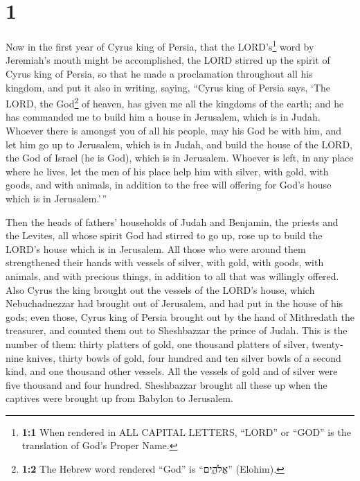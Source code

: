 \hypertarget{section}{%
\section{1}\label{section}}

 Now in the first year of Cyrus king of Persia, that the
LORD's\footnote{\textbf{1:1} When rendered in ALL CAPITAL LETTERS,
  ``LORD'' or ``GOD'' is the translation of God's Proper Name.} word by
Jeremiah's mouth might be accomplished, the LORD stirred up the spirit
of Cyrus king of Persia, so that he made a proclamation throughout all
his kingdom, and put it also in writing, saying,  ``Cyrus
king of Persia says, `The LORD, the God\footnote{\textbf{1:2} The Hebrew
  word rendered ``God'' is ``אֱלֹהִ֑ים'' (Elohim).} of heaven, has given
me all the kingdoms of the earth; and he has commanded me to build him a
house in Jerusalem, which is in Judah.  Whoever there is
amongst you of all his people, may his God be with him, and let him go
up to Jerusalem, which is in Judah, and build the house of the LORD, the
God of Israel (he is God), which is in Jerusalem.  Whoever
is left, in any place where he lives, let the men of his place help him
with silver, with gold, with goods, and with animals, in addition to the
free will offering for God's house which is in Jerusalem.'\,''

 Then the heads of fathers' households of Judah and
Benjamin, the priests and the Levites, all whose spirit God had stirred
to go up, rose up to build the LORD's house which is in Jerusalem.
 All those who were around them strengthened their hands
with vessels of silver, with gold, with goods, with animals, and with
precious things, in addition to all that was willingly offered.
 Also Cyrus the king brought out the vessels of the LORD's
house, which Nebuchadnezzar had brought out of Jerusalem, and had put in
the house of his gods;  even those, Cyrus king of Persia
brought out by the hand of Mithredath the treasurer, and counted them
out to Sheshbazzar the prince of Judah.  This is the
number of them: thirty platters of gold, one thousand platters of
silver, twenty-nine knives,  thirty bowls of gold, four
hundred and ten silver bowls of a second kind, and one thousand other
vessels.  All the vessels of gold and of silver were five
thousand and four hundred. Sheshbazzar brought all these up when the
captives were brought up from Babylon to Jerusalem.

